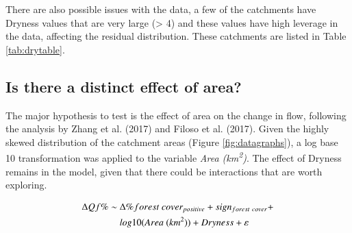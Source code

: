 \documentclass[]{elsarticle} %
\begin{document}
There are also possible issues with the data, a few of the catchments have Dryness values that are very large (\textgreater{} 4) and these values have high leverage in the data, affecting the residual distribution. These catchments are listed in Table \ref{tab:drytable}.

\hypertarget{is-there-a-distinct-effect-of-area}{%
\subsection{Is there a distinct effect of area?}\label{is-there-a-distinct-effect-of-area}}

The major hypothesis to test is the effect of area on the change in flow, following the analysis by Zhang et al. (2017) and Filoso et al. (2017). Given the highly skewed distribution of the catchment areas (Figure \ref{fig:datagraphs}), a log base 10 transformation was applied to the variable \emph{Area (km\textsuperscript{2})}. The effect of Dryness remains in the model, given that there could be interactions that are worth exploring.

\begin{align}
\Delta Qf \% \sim ~ & \Delta \% forest~cover_{positive} + sign_{forest~cover} + \notag \\ & log10(Area ~(km^2)) + Dryness + \varepsilon \label{eq:eq6}
\end{align}
\end{document}

